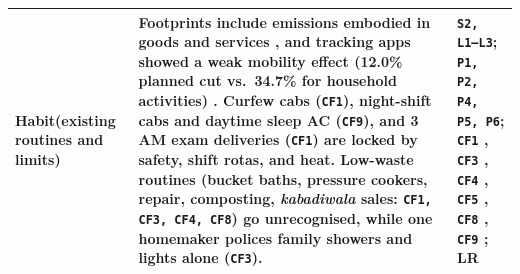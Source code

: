 \documentclass[12pt, a4paper]{article}
\begin{document}
{\begin{longtable}{|>{\raggedright\arraybackslash}p{2.5cm}|>{\raggedright\arraybackslash}p{9.2cm}|>{\raggedright\arraybackslash}p{4.3cm}|}
\hline
\textbf{Habit}\newline (existing routines and limits) & Footprints include emissions embodied in goods and services \cite{shi2021}, and tracking apps showed a weak mobility effect (12.0\% planned cut vs.\ 34.7\% for household activities) \cite{hoffmann2024}. Curfew cabs (\texttt{CF1}), night-shift cabs and daytime sleep AC (\texttt{CF9}), and 3 AM exam deliveries (\texttt{CF1}) are locked by safety, shift rotas, and heat. Low-waste routines (bucket baths, pressure cookers, repair, composting, \textit{kabadiwala} sales: \texttt{CF1, CF3, CF4, CF8}) go unrecognised, while one homemaker polices family showers and lights alone (\texttt{CF3}). & \texttt{S2, L1--L3}; \texttt{P1, P2, P4, P5, P6}; \texttt{CF1} \cite{cf1}, \texttt{CF3} \cite{cf3}, \texttt{CF4} \cite{cf4}, \texttt{CF5} \cite{cf5}, \texttt{CF8} \cite{cf8}, \texttt{CF9} \cite{cf9}; LR \cite{shi2021,hoffmann2024} \\
\hline
\end{longtable}
}
\end{document}

